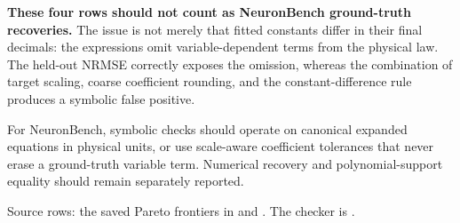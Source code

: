 \documentclass[11pt]{article}
\begin{document}
\textcolor{warning}{\textbf{These four rows should not count as NeuronBench
ground-truth recoveries.}}  The issue is not merely that fitted constants differ
in their final decimals: the expressions omit variable-dependent terms from the
physical law.  The held-out NRMSE correctly exposes the omission, whereas the
combination of target scaling, coarse coefficient rounding, and the
constant-difference rule produces a symbolic false positive.

For NeuronBench, symbolic checks should operate on canonical expanded equations
in physical units, or use scale-aware coefficient tolerances that never erase a
ground-truth variable term.  Numerical recovery and polynomial-support equality
should remain separately reported.

\vfill
\footnotesize\raggedright
Source rows: the saved Pareto frontiers in
 and
.  The checker is
.
\end{document}
